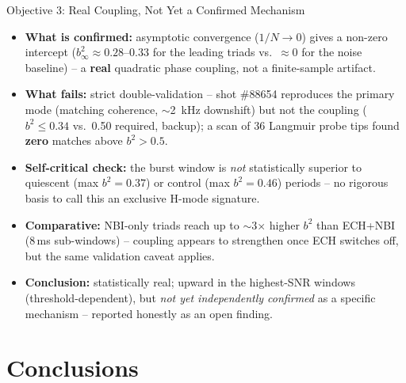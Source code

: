 \documentclass[aspectratio=169]{beamer}
\begin{document}
\begin{frame}{Objective 3: Real Coupling, Not Yet a Confirmed Mechanism}
    \footnotesize
    \begin{itemize}
        \item \textbf{What is confirmed:} asymptotic convergence ($1/N\to0$)
        gives a non-zero intercept ($b^2_\infty\approx0.28$--$0.33$ for the
        leading triads vs.\ $\approx0$ for the noise baseline) -- a
        \textbf{real} quadratic phase coupling, not a finite-sample artifact.
        \item \textbf{What fails:} strict double-validation -- shot
        \#88654 reproduces the primary mode (matching coherence,
        $\sim$\SI{2}{kHz} downshift) but not the coupling ($b^2\le0.34$
        vs.\ \num{0.50} required, backup); a scan of 36 Langmuir probe
        tips found \textbf{zero} matches above $b^2>0.5$.
        \item \textbf{Self-critical check:} the burst window is \emph{not}
        statistically superior to quiescent (max $b^2=0.37$) or control
        (max $b^2=0.46$) periods -- no rigorous basis to call this an
        exclusive H-mode signature.
        \item \textbf{Comparative:} NBI-only triads reach up to $\sim$3$\times$
        higher $b^2$ than ECH+NBI (8\,ms sub-windows) -- coupling appears to strengthen once ECH switches off, but the same validation caveat applies.
        \item \textbf{Conclusion:} statistically real; upward in the highest-SNR
        windows (threshold-dependent), but \emph{not yet independently confirmed}
        as a specific mechanism -- reported honestly as an open finding.
    \end{itemize}
\end{frame}

\section{Conclusions}
\end{document}
